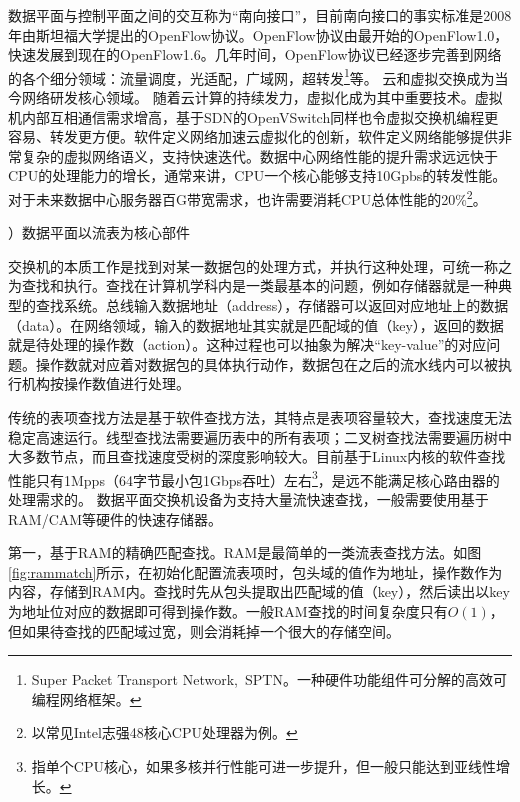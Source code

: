 数据平面与控制平面之间的交互称为“南向接口”，目前南向接口的事实标准是2008年由斯坦福大学提出的OpenFlow协议。OpenFlow协议由最开始的OpenFlow1.0，快速发展到现在的OpenFlow1.6。几年时间，OpenFlow协议已经逐步完善到网络的各个细分领域：流量调度，光适配，广域网，超转发\footnote{Super Packet Transport Network,~SPTN。一种硬件功能组件可分解的高效可编程网络框架。}等。
云和虚拟交换成为当今网络研发核心领域。
随着云计算的持续发力，虚拟化成为其中重要技术。虚拟机内部互相通信需求增高，基于SDN的OpenVSwitch同样也令虚拟交换机编程更容易、转发更方便。软件定义网络加速云虚拟化的创新，软件定义网络能够提供非常复杂的虚拟网络语义，支持快速迭代。数据中心网络性能的提升需求远远快于CPU的处理能力的增长，通常来讲，CPU一个核心能够支持10Gpbs的转发性能。对于未来数据中心服务器百G带宽需求，也许需要消耗CPU总体性能的20\%\footnote{以常见Intel志强48核心CPU处理器为例。}。






{）数据平面以流表为核心部件}


交换机的本质工作是找到对某一数据包的处理方式，并执行这种处理，可统一称之为查找和执行。查找在计算机学科内是一类最基本的问题，例如存储器就是一种典型的查找系统。总线输入数据地址（address），存储器可以返回对应地址上的数据（data）。在网络领域，输入的数据地址其实就是匹配域的值（key），返回的数据就是待处理的操作数（action）。这种过程也可以抽象为解决“key-value”的对应问题。操作数就对应着对数据包的具体执行动作，数据包在之后的流水线内可以被执行机构按操作数值进行处理。

传统的表项查找方法是基于软件查找方法，其特点是表项容量较大，查找速度无法稳定高速运行。线型查找法需要遍历表中的所有表项；二叉树查找法需要遍历树中大多数节点，而且查找速度受树的深度影响较大。目前基于Linux内核的软件查找性能只有1Mpps（64字节最小包1Gbps吞吐）左右\footnote{指单个CPU核心，如果多核并行性能可进一步提升，但一般只能达到亚线性增长。}，是远不能满足核心路由器的处理需求的。
数据平面交换机设备为支持大量流快速查找，一般需要使用基于RAM/CAM等硬件的快速存储器。

第一，基于RAM的精确匹配查找。RAM是最简单的一类流表查找方法。如图\ref{fig:rammatch}所示，在初始化配置流表项时，包头域的值作为地址，操作数作为内容，存储到RAM内。查找时先从包头提取出匹配域的值（key），然后读出以key为地址位对应的数据即可得到操作数。一般RAM查找的时间复杂度只有$O(1)$，但如果待查找的匹配域过宽，则会消耗掉一个很大的存储空间。

